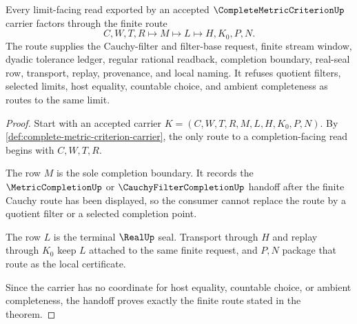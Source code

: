 \begin{theorem}
\label{thm:complete-metric-criterion-cauchy-limit-handoff}
Every limit-facing read exported by an accepted
$\CompleteMetricCriterionUp$ carrier factors through the finite route
$$
C,W,T,R \longmapsto M \longmapsto L \longmapsto H,K_0,P,N .
$$
The route supplies the Cauchy-filter and filter-base request, finite stream
window, dyadic tolerance ledger, regular rational readback, completion
boundary, real-seal row, transport, replay, provenance, and local naming. It
refuses quotient filters, selected limits, host equality, countable choice,
and ambient completeness as routes to the same limit.
\end{theorem}
\begin{proof}
Start with an accepted carrier
$K=(C,W,T,R,M,L,H,K_0,P,N)$. By
\autoref{def:complete-metric-criterion-carrier}, the only route to a
completion-facing read begins with $C,W,T,R$.

The row $M$ is the sole completion boundary. It records the
$\MetricCompletionUp$ or $\CauchyFilterCompletionUp$ handoff after the finite
Cauchy route has been displayed, so the consumer cannot replace the route by
a quotient filter or a selected completion point.

The row $L$ is the terminal $\RealUp$ seal. Transport through $H$ and replay
through $K_0$ keep $L$ attached to the same finite request, and $P,N$ package
that route as the local certificate.

Since the carrier has no coordinate for host equality, countable choice, or
ambient completeness, the handoff proves exactly the finite route stated in
the theorem.
\end{proof}




